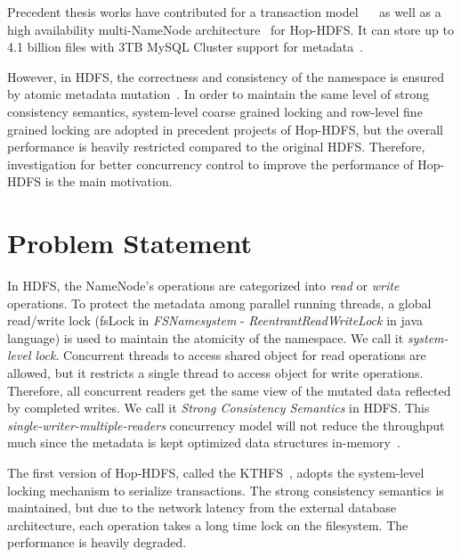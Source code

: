 \noindent Precedent thesis works have contributed for a transaction model~\cite{wasif2012distributed} ~\cite{peiro2013maintaining} as well as a high availability multi-NameNode architecture~\cite{d2013kthfs} for Hop-HDFS. It can store up to 4.1 billion files with 3TB MySQL Cluster support for metadata~\cite{hakimzadeh2014scaling}. 

\noindent However, in HDFS, the correctness and consistency of the namespace is ensured by atomic metadata mutation~\cite{shvachko2010hadoop}. In order to maintain the same level of strong consistency semantics, system-level coarse grained locking and row-level fine grained locking are adopted in precedent projects of Hop-HDFS, but the overall performance is heavily restricted compared to the original HDFS. Therefore, investigation for better concurrency control to improve the performance of Hop-HDFS is the main motivation.

\section{Problem Statement}

In HDFS, the NameNode's operations are categorized into \textit{read} or \textit{write} operations. To protect the metadata among parallel running threads, a global read/write lock (fsLock in \textit{FSNamesystem} - \textit{ReentrantReadWriteLock} in java language) is used to maintain the atomicity of the namespace. We call it \textit{system-level lock}. Concurrent threads to access shared object for read operations are allowed, but it restricts a single thread to access object for write operations. Therefore, all concurrent readers get the same view of the mutated data reflected by completed writes. We call it \textit{Strong Consistency Semantics} in HDFS. This \textit{single-writer-multiple-readers} concurrency model will not reduce the throughput much since the metadata is kept optimized data structures in-memory~\cite{hakimzadeh2014scaling}.

\noindent The first version of Hop-HDFS, called the KTHFS~\cite{wasif2012distributed}, adopts the system-level locking mechanism to serialize transactions. The strong consistency semantics is maintained, but due to the network latency from the external database architecture, each operation takes a long time lock on the filesystem. The performance is heavily degraded.

